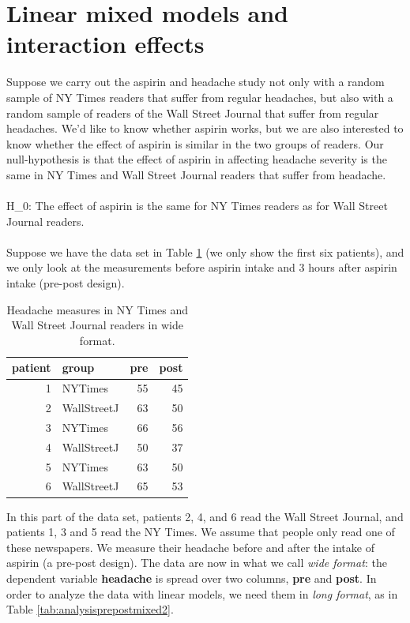 \documentclass[]{book}\usepackage[]{graphicx}\usepackage[]{color}
\begin{document}
\section{Linear mixed models and interaction effects}


Suppose we carry out the aspirin and headache study not only with a random sample of NY Times readers that suffer from regular headaches, but also with a random sample of readers of the Wall Street Journal that suffer from regular headaches. We'd like to know whether aspirin works, but we are also interested to know whether the effect of aspirin is similar in the two groups of readers. Our null-hypothesis is that the effect of aspirin in affecting headache severity is the same in NY Times and Wall Street Journal readers that suffer from headache.\\
\\
H\_0: The effect of aspirin is the same for NY Times readers as for Wall Street Journal readers.
\\
\\
Suppose we have the data set in Table \ref{tab:analysisprepostmixed1} (we only show the first six patients), and we only look at the measurements before aspirin intake and 3 hours after aspirin intake (pre-post design). 

\begin{table}[ht]
\centering
\caption{Headache measures in NY Times and Wall Street Journal readers in wide format.} 
\label{tab:analysisprepostmixed1}
\begin{tabular}{rlrr}
  \hline
patient & group & pre & post \\ 
  \hline
1 & NYTimes & 55 & 45 \\ 
  2 & WallStreetJ & 63 & 50 \\ 
  3 & NYTimes & 66 & 56 \\ 
  4 & WallStreetJ & 50 & 37 \\ 
  5 & NYTimes & 63 & 50 \\ 
  6 & WallStreetJ & 65 & 53 \\ 
   \hline
\end{tabular}
\end{table}




In this part of the data set, patients 2, 4, and 6 read the Wall Street Journal, and patients 1, 3 and 5 read the NY Times. We assume that people only read one of these newspapers. We measure their headache before and after the intake of aspirin (a pre-post design). The data are now in what we call \textit{wide format}: the dependent variable \textbf{headache} is spread over two columns, \textbf{pre} and \textbf{post}. In order to analyze the data with linear models, we need them in \textit{long format}, as in Table \ref{tab:analysisprepostmixed2}. 
\end{document}
